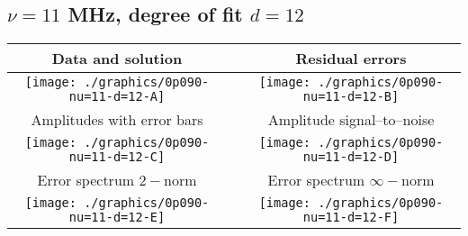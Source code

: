 

% 

\clearpage{}
\break{}

\subsection{$\nu = 11$ MHz, degree of fit $d = 12$}

\begin{table}[h]
    \begin{center}
        \begin{tabular}{ccc}
            Data and solution & \quad & Residual errors \\\hline
            \texttt{[image: ./graphics/0p090-nu=11-d=12-A]} &&
            \texttt{[image: ./graphics/0p090-nu=11-d=12-B]} \\[15pt]
            Amplitudes with error bars && Amplitude signal--to--noise \\\hline
            \texttt{[image: ./graphics/0p090-nu=11-d=12-C]} &&
            \texttt{[image: ./graphics/0p090-nu=11-d=12-D]} \\[15pt]
            Error spectrum $2-$norm && Error spectrum $\infty-$norm \\\hline
            \texttt{[image: ./graphics/0p090-nu=11-d=12-E]} &&
            \texttt{[image: ./graphics/0p090-nu=11-d=12-F]} \\[15pt]
        \end{tabular}
    \end{center}
\label{fig:elev=90, nu=11}
\end{table}



\endinput
